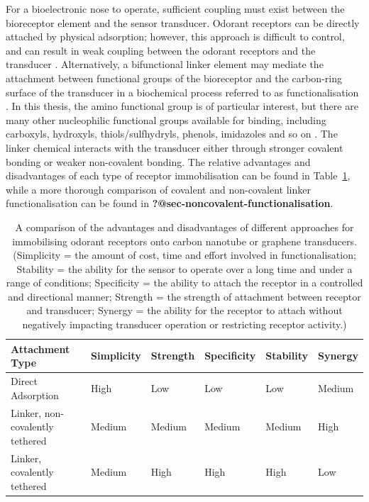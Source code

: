 \documentclass[
  a4paper,
]{scrbook}
\begin{document}
For a bioelectronic nose to operate, sufficient coupling must exist
between the bioreceptor element and the sensor transducer. Odorant
receptors can be directly attached by physical adsorption; however, this
approach is difficult to control, and can result in weak coupling
between the odorant receptors and the transducer \autocite{Dung2018}.
Alternatively, a bifunctional linker element may mediate the attachment
between functional groups of the bioreceptor and the carbon-ring surface
of the transducer in a biochemical process referred to as
functionalisation \autocite{Star2003a}. In this thesis, the amino
functional group is of particular interest, but there are many other
nucleophilic functional groups available for binding, including
carboxyls, hydroxyls, thiols/sulfhydryls, phenols, imidazoles and so on
\autocite{Fruh2011,Dung2018}. The linker chemical interacts with the
transducer either through stronger covalent bonding or weaker
non-covalent bonding. The relative advantages and disadvantages of each
type of receptor immobilisation can be found in
Table~\ref{tbl-functionalisation-types}, while a more thorough
comparison of covalent and non-covalent linker functionalisation can be
found in \textbf{?@sec-noncovalent-functionalisation}.

\hypertarget{tbl-functionalisation-types}{}
\begin{longtable}[t]{>{\raggedright\arraybackslash}p{5.4cm}>{\raggedright\arraybackslash}p{1.45cm}>{\raggedright\arraybackslash}p{1.3cm}>{\raggedright\arraybackslash}p{1.45cm}>{\raggedright\arraybackslash}p{1.3cm}>{\raggedright\arraybackslash}p{1.3cm}}
\caption{\label{tbl-functionalisation-types}A comparison of the advantages and disadvantages of different approaches
for immobilising odorant receptors onto carbon nanotube or graphene
transducers. (Simplicity = the amount of cost, time and effort involved
in functionalisation; Stability = the ability for the sensor to operate
over a long time and under a range of conditions; Specificity = the
ability to attach the receptor in a controlled and directional manner;
Strength = the strength of attachment between receptor and transducer;
Synergy = the ability for the receptor to attach without negatively
impacting transducer operation or restricting receptor activity.) }\tabularnewline

\toprule
Attachment Type & Simplicity & Strength & Specificity & Stability & Synergy\\
\midrule
Direct Adsorption & High & Low & Low & Low & Medium\\
Linker, non-covalently tethered & Medium & Medium & Medium & Medium & High\\
Linker, covalently tethered & Medium & High & High & High & Low\\
\bottomrule
\end{longtable}
\end{document}
